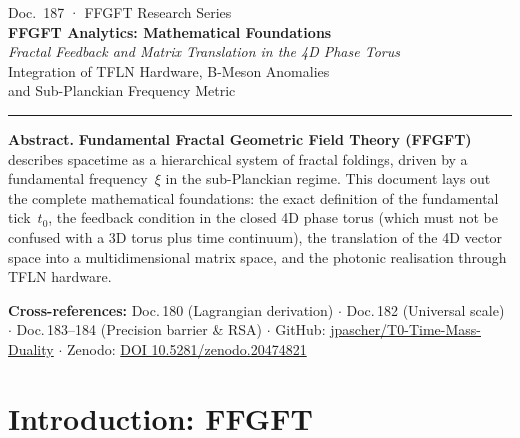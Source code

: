
\thispagestyle{firstpage}
\begin{center}
  {\small\color{T0gray} Doc.~187 · FFGFT Research Series}\\[6pt]
  {\LARGE\bfseries\color{T0blue}
    FFGFT Analytics: Mathematical Foundations}\\[6pt]
  {\large\itshape\color{T0gray}
    Fractal Feedback and Matrix Translation in the 4D Phase Torus}\\[4pt]
  {\normalsize\color{T0gray}
    Integration of TFLN Hardware, B-Meson Anomalies\\
    and Sub-Planckian Frequency Metric}\\[8pt]
  {\color{T0red}\rule{0.65\linewidth}{1.5pt}}
\end{center}
\vspace{4pt}

\begin{infobox}
\textbf{Abstract.}
\textbf{Fundamental Fractal Geometric Field Theory (FFGFT)} describes
spacetime as a hierarchical system of fractal foldings, driven by a
fundamental frequency~$\xi$ in the sub-Planckian regime.
This document lays out the complete mathematical foundations:
the exact definition of the fundamental tick~$t_0$, the feedback condition
in the closed 4D phase torus (which must not be confused with a 3D torus
plus time continuum), the translation of the 4D vector space into a
multidimensional matrix space, and the photonic realisation through
TFLN hardware.

\smallskip\noindent\textbf{Cross-references:}
Doc.\,180 (Lagrangian derivation) $\cdot$
Doc.\,182 (Universal scale) $\cdot$
Doc.\,183--184 (Precision barrier \& RSA) $\cdot$
GitHub: \href{https://github.com/jpascher/T0-Time-Mass-Duality}{jpascher/T0-Time-Mass-Duality} $\cdot$
Zenodo: \href{https://zenodo.org/records/20474821}{DOI 10.5281/zenodo.20474821}
\end{infobox}

\tableofcontents
\bigskip

\section{Introduction: FFGFT}

